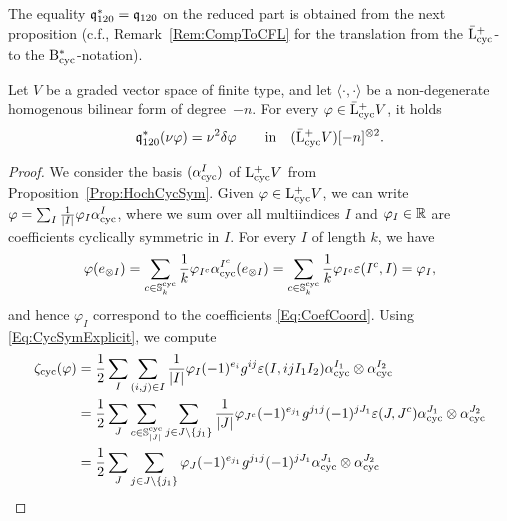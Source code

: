 \documentclass[\MainFolder/Text.tex]{subfiles}
\begin{document}
The equality $\mathfrak{q}_{120}^*= \mathfrak{q}_{120}$ on the reduced part
is obtained from the next proposition (c.f., Remark~\ref{Rem:CompToCFL} for the translation from the $\bar{\mathrm{L}}^+_{\mathrm{cyc}}$- to the  $\mathrm{B}_{\mathrm{cyc}}^*$-notation).
\begin{Proposition}\label{Prop:EqCoprod}
Let $V$ be a graded vector space of finite type, and let $\langle\cdot,\cdot\rangle$ be a non-degenerate homogenous bilinear form of degree~$-n$. For every $\varphi\in \bar{\mathrm{L}}^+_{\mathrm{cyc}} V$, it holds
\[ \mathfrak{q}_{120}^*(\nu \varphi) = \nu^2 \delta \varphi\qquad\text{in}\quad(\bar{\mathrm{L}}^+_{\mathrm{cyc}} V)[-n]^{\otimes 2}. \]
\end{Proposition}
\begin{proof}
We consider the basis $(\alpha^I_{\mathrm{cyc}})$ of $\mathrm{L}^+_{\mathrm{cyc}} V$ from Proposition~\ref{Prop:HochCycSym}. Given $\varphi\in\mathrm{L}^+_{\mathrm{cyc}} V$, we can write $\varphi=\sum_{I}\frac{1}{|I|}\varphi_I\alpha^I_{\mathrm{cyc}}$, where we sum over all multiindices $I$ and $\varphi_I\in \mathbb{R}$ are coefficients cyclically symmetric in $I$. For every $I$ of length $k$, we have
\[ \varphi(e_{\otimes I}) = \sum_{c\in \mathbb{S}^{\mathrm{cyc}}_k}\frac{1}{k}\varphi_{I^c} \alpha^{I^c}_{\mathrm{cyc}}(e_{\otimes I}) = \sum_{c\in\mathbb{S}^{\mathrm{cyc}}_k}\frac{1}{k}\varphi_{I^c} \varepsilon(I^c,I) = \varphi_I, \]
and hence $\varphi_I$ correspond to the coefficients \eqref{Eq:CoefCoord}. Using \eqref{Eq:CycSymExplicit}, we compute
\begin{align*}
 \CoProdCyc(\varphi)&= \frac{1}{2}\sum_I \sum_{(i,j)\in I} \frac{1}{\Abs{I}}\varphi_I  (-1)^{e_i} g^{ij}\varepsilon(I,i j I_1 I_2) \alpha^{I_1}_{\CycMRM} \otimes \alpha^{I_2}_{\CycMRM} \\
 &=\frac{1}{2}\sum_J \sum_{c\in \CycPerm_{\Abs{J}}} \sum_{j \in J\backslash\{j_1\}} \frac{1}{\Abs{J}}\varphi_{J^c} (-1)^{e_{j_1}} g^{{j_1} j}(-1)^{j J_1}\varepsilon(J,J^c) \alpha^{J_1}_{\CycMRM} \otimes \alpha^{J_2}_{\CycMRM} \\
 &=\frac{1}{2}\sum_J\sum_{j\in J\backslash\{j_1\}} \varphi_J(-1)^{e_{j_1}}g^{j_1 j}(-1)^{j J_1} \alpha_{\CycMRM}^{J_1}\otimes \alpha_{\CycMRM}^{J_2}  \\

\end{align*}
\end{proof}
\end{document}
